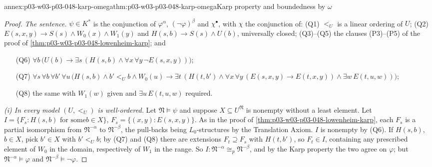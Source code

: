 \begin{annexitem}{annex:p03-w03-p03-048-karp-omega}{thm:p03-w03-p03-048-karp-omega}{Karp property and boundedness by \(\omega\)}
\begin{proof}
\emph{The sentence.}  \(\psi\in K^{\ast}\) is the conjunction of
\(\varphi^{\alpha}\), \((\neg\varphi)^{\beta}\) and \(\chi^{\bullet}\), with
\(\chi\) the conjunction of: (Q1) \(<_U\) is a linear ordering of \(U\);
(Q2) \(E(s,x,y)\to S(s)\land W_0(x)\land W_1(y)\) and \(H(s,b)\to
S(s)\land U(b)\), universally closed; (Q3)--(Q5) the clauses (P3)--(P5) of
the proof of \cref{thm:p03-w03-p03-048-lowenheim-karp}; and
\begin{enumerate}
\item[(Q6)] \(\forall b\,\bigl(U(b)\to\exists s\,(H(s,b)\land\forall x\,
      \forall y\,\neg E(s,x,y))\bigr)\);
\item[(Q7)] \(\forall s\,\forall b\,\forall b'\,\forall u\,\bigl(H(s,b)\land
      b'<_Ub\land W_0(u)\to\exists t\,(H(t,b')\land\forall x\,\forall y\,
      (E(s,x,y)\to E(t,x,y))\land\exists w\,E(t,u,w))\bigr)\);
\item[(Q8)] the same with \(W_1(w)\) given and \(\exists u\,E(t,u,w)\)
      required.
\end{enumerate}

\emph{(i) In every model \((U,<_U)\) is well-ordered.}  Let
\(\mathfrak N\models\psi\) and suppose \(X\subseteq U^{\mathfrak N}\) is
nonempty without a least element.  Let \(I=\{F_s:H(s,b)\text{ for some
}b\in X\}\), \(F_s=\{(x,y):E(s,x,y)\}\).  As in the proof of
\cref{thm:p03-w03-p03-048-lowenheim-karp}, each \(F_s\) is a partial
isomorphism from \(\mathfrak N^{-\alpha}\) to \(\mathfrak N^{-\beta}\), the
pull-backs being \(L_0\)-structures by the Translation Axiom.  \(I\) is
nonempty by (Q6).  If \(H(s,b)\), \(b\in X\), pick \(b'\in X\) with
\(b'<_Ub\); by (Q7) and (Q8) there are extensions \(F_t\supseteq F_s\) with
\(H(t,b')\), so \(F_t\in I\), containing any prescribed element of
\(W_0\) in the domain, respectively of \(W_1\) in the range.  So
\(I:\mathfrak N^{-\alpha}\cong_p\mathfrak N^{-\beta}\), and by the Karp
property the two agree on \(\varphi\); but \(\mathfrak N^{-\alpha}\models
\varphi\) and \(\mathfrak N^{-\beta}\models\neg\varphi\).


\end{proof}
\end{annexitem}
